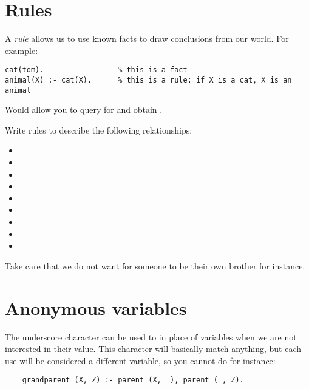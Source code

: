\documentclass{../../../tp}
\begin{document}
\section{Rules}

A \emph{rule} allows us to use known facts to draw conclusions from our world. For example:

\begin{verbatim}
cat(tom).                 % this is a fact
animal(X) :- cat(X).      % this is a rule: if X is a cat, X is an animal
\end{verbatim}

Would allow you to query for  and obtain .


\begin{instruction}
	Write rules to describe the following relationships:
	\begin{itemize}
	 \item {}
	 \item {}
	 \item {}
	 \item {}
	 \item {}
	 \item {}
	 \item {}
	 \item {}
	 \item {}
	\end{itemize}
	
	Take care that we do not want for someone to be their own brother for instance.
\end{instruction}

\section{Anonymous variables}

The underscore character can be used to in place of variables when we are not interested in their value. This character will basically match anything, but each use will be considered a different variable, so you cannot do for instance:

\begin{verbatim}
	grandparent (X, Z) :- parent (X, _), parent (_, Z).
\end{verbatim}
\end{document}

